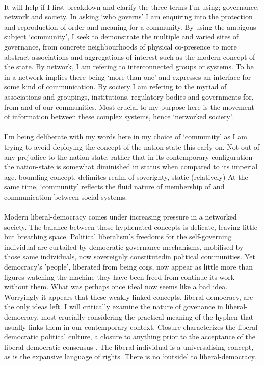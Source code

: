 \paragraph{}It will help if I first breakdown and clarify the three terms I'm using; governance, network and society. In asking `who governs' I am enquiring into the protection and reproduction of order and meaning for a community. By using the ambigous subject `community', I seek to demonstrate the multiple and varied sites of governance, from concrete neighbourhoods of physical co-presence to more abstract associations and aggregations of interest such as the modern concept of the state. By network, I am refering to interconnected groups or systems. To be in a network implies there being `more than one' and expresses an interface for some kind of communication. By society I am refering to the myriad of associations and groupings, institutions, regulatory bodies and governments for, from and of our communities. Most crucial to my purpose here is the movement of information between these complex systems, hence `networked society'.

\paragraph{}I'm being deliberate with my words here in my choice of `community' as I am trying to avoid deploying the concept of the nation-state this early on. Not out of any prejudice to the nation-state, rather that in its contemporary configuration the nation-state is somewhat diminished in status when compared to its imperial age. bounding concept, delimites realm of soverignty, static (relatively) At the same time, `community' reflects the fluid nature of membership of and communication between social systems.

\paragraph{}Modern liberal-democracy comes under increasing pressure in a networked society. The balance between those hyphenated concepts is delicate, leaving little but breathing space. Political liberalism's freedoms for the self-governing individual are curtailed by democratic governance mechanisms, mobilised by those same individuals, now sovereignly constitutedin political communities. Yet democracy's 'people', liberated from being cogs, now appear as little more than figures watching the machine they have been freed from continue its work without them. What was perhaps once ideal now seems like a bad idea. Worryingly it appears that these weakly linked concepts, liberal-democracy, are the only ideas left. I will critically examine the nature of govenance in liberal-democracy, most crucially considering the practical meaning of the hyphen that usually links them in our contemporary context. Closure characterizes the liberal-democratic political culture, a closure to anything prior to the acceptance of the liberal-democratic consensus \cite{Mouffe:2000fk}. The liberal individual is a universalising concept, as is the expansive language of rights. There is no `outside' to liberal-democracy.

